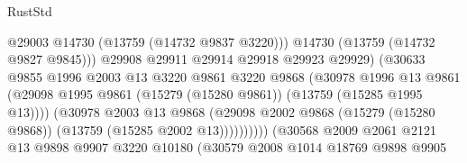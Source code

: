 \begin{lexlean}{RustStd}
\begin{coremodule}
                                              @29003
                                              @14730
                                              (@13759 (@14732 @9837 @3220)))
                                            @14730
                                            (@13759 (@14732 @9827 @9845)))
                                          @29908
                                          @29911
                                          @29914
                                          @29918
                                          @29923
                                          @29929)
                                        (@30633
                                          @9855
                                          @1996
                                          @2003
                                          @13
                                          @3220
                                          @9861
                                          @3220
                                          @9868
                                          (@30978
                                            @1996
                                            @13
                                            @9861
                                            (@29098
                                              @1995
                                              @9861
                                              (@15279 (@15280 @9861))
                                              (@13759 (@15285 @1995 @13))))
                                          (@30978
                                            @2003
                                            @13
                                            @9868
                                            (@29098
                                              @2002
                                              @9868
                                              (@15279 (@15280 @9868))
                                              (@13759 (@15285 @2002 @13))))))))))
                              (@30568
                                @2009
                                @2061
                                @2121
                                @13
                                @9898
                                @9907
                                @3220
                                @10180
                                (@30579
                                  @2008
                                  @1014
                                  @18769
                                  @9898
                                  @9905

\end{coremodule}
\end{lexlean}
